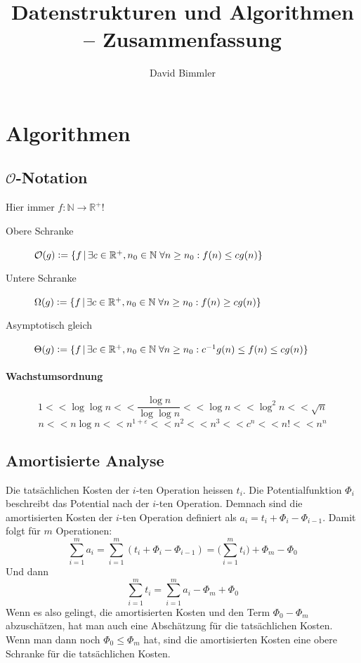 \documentclass[a4paper, 9pt, DIV=20]{scrartcl}
\title{Datenstrukturen und Algorithmen -- Zusammenfassung}
\author{David Bimmler}
\newcommand{\N}{\mathbb{N}}
\newcommand{\R}{\mathbb{R}}
\newcommand{\Oh}{\mathcal{O}}
\newcommand{\defeq}{\vcentcolon=}
\begin{document}
\pagestyle{fancy}
\fancyhf{}

\begin{twocolumn}
\tableofcontents
\end{twocolumn}

\clearpage




\section{Algorithmen}

\subsection{$\Oh$-Notation}
Hier immer $f:\N\to\R^{+}$!
\begin{description}
\item[Obere Schranke] $ \mathcal O(g) \defeq \{f\,|\,\exists c\in\R^{+}, n_{0} \in\N\;\forall n \geq n_{0}:f(n) \leq cg(n)\} $
\item[Untere Schranke] $ \Omega(g) \defeq \{f\,|\,\exists c\in\R^{+}, n_{0} \in \N\;\forall n \geq n_{0}:f(n) \geq cg(n)\} $
\item[Asymptotisch gleich] $ \Theta(g) \defeq \{f\,|\,\exists c\in\R^{+}, n_{0} \in \N\;\forall n \geq n_{0}:  c^{-1}g(n) \leq f(n) \leq cg(n)\} $
\end{description}
\paragraph{Wachstumsordnung}
\[ 1 << \log\log n << \frac{\log n}{\log\log n} << \log n << \log^{2} n << \sqrt{n}\]
\[ n << n \log n << n^{1+\varepsilon} << n^{2} << n^{3} << c^{n} << n! << n^{n}\]

\subsection{Amortisierte Analyse}
Die tatsächlichen Kosten der $i$-ten Operation heissen $t_{i}$. Die Potentialfunktion $\Phi_{i}$ beschreibt das Potential nach der $i$-ten Operation. Demnach sind die amortisierten Kosten der $i$-ten Operation definiert als $a_{i}=t_{i}+\Phi_{i}-\Phi_{i-1}$. Damit folgt für $m$ Operationen: \[ \sum_{i=1}^{m}{a_{i}} = \sum_{i=1}^{m}{(t_{i}+\Phi_{i}-\Phi_{i-1})} = \Bigg( \sum_{i=1}^{m}{t_{i}}\Bigg) + \Phi_{m} - \Phi_{0}\]
Und dann \[ \sum_{i=1}^{m}{t_{i}} = \sum_{i=1}^{m}{a_{i}} - \Phi_{m} + \Phi_{0} \]
Wenn es also gelingt, die amortisierten Kosten und den Term $\Phi_{0} - \Phi_{m}$ abzuschätzen, hat man auch eine Abschätzung für die tatsächlichen Kosten. Wenn man dann noch $\Phi_{0} \leq \Phi_{m}$ hat, sind die amortisierten Kosten eine obere Schranke für die tatsächlichen Kosten.
\end{document}
